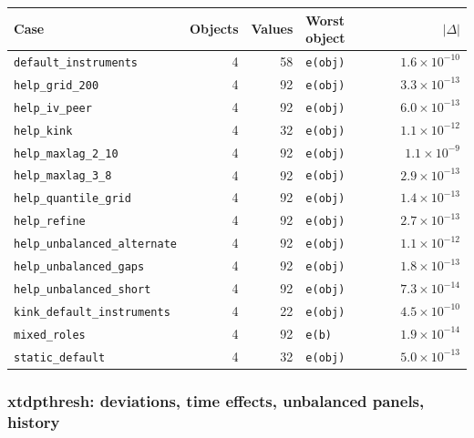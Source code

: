 \begin{longtable}{@{}p{3.6cm}rrp{4.9cm}r@{}}
\toprule
Case & Objects & Values & Worst object & $|\Delta|$ \\
\midrule
\endhead
\texttt{default\_\allowbreak{}instruments} & 4 & 58 & \texttt{e(obj)} & $1.6\times10^{-10}$ \\
\texttt{help\_\allowbreak{}grid\_\allowbreak{}200} & 4 & 92 & \texttt{e(obj)} & $3.3\times10^{-13}$ \\
\texttt{help\_\allowbreak{}iv\_\allowbreak{}peer} & 4 & 92 & \texttt{e(obj)} & $6.0\times10^{-13}$ \\
\texttt{help\_\allowbreak{}kink} & 4 & 32 & \texttt{e(obj)} & $1.1\times10^{-12}$ \\
\texttt{help\_\allowbreak{}maxlag\_\allowbreak{}2\_\allowbreak{}10} & 4 & 92 & \texttt{e(obj)} & $1.1\times10^{-9}$ \\
\texttt{help\_\allowbreak{}maxlag\_\allowbreak{}3\_\allowbreak{}8} & 4 & 92 & \texttt{e(obj)} & $2.9\times10^{-13}$ \\
\texttt{help\_\allowbreak{}quantile\_\allowbreak{}grid} & 4 & 92 & \texttt{e(obj)} & $1.4\times10^{-13}$ \\
\texttt{help\_\allowbreak{}refine} & 4 & 92 & \texttt{e(obj)} & $2.7\times10^{-13}$ \\
\texttt{help\_\allowbreak{}unbalanced\_\allowbreak{}alternate} & 4 & 92 & \texttt{e(obj)} & $1.1\times10^{-12}$ \\
\texttt{help\_\allowbreak{}unbalanced\_\allowbreak{}gaps} & 4 & 92 & \texttt{e(obj)} & $1.8\times10^{-13}$ \\
\texttt{help\_\allowbreak{}unbalanced\_\allowbreak{}short} & 4 & 92 & \texttt{e(obj)} & $7.3\times10^{-14}$ \\
\texttt{kink\_\allowbreak{}default\_\allowbreak{}instruments} & 4 & 22 & \texttt{e(obj)} & $4.5\times10^{-10}$ \\
\texttt{mixed\_\allowbreak{}roles} & 4 & 92 & \texttt{e(b)} & $1.9\times10^{-14}$ \\
\texttt{static\_\allowbreak{}default} & 4 & 32 & \texttt{e(obj)} & $5.0\times10^{-13}$ \\
\bottomrule
\end{longtable}

\subsubsection*{xtdpthresh: deviations, time effects, unbalanced panels, history}

